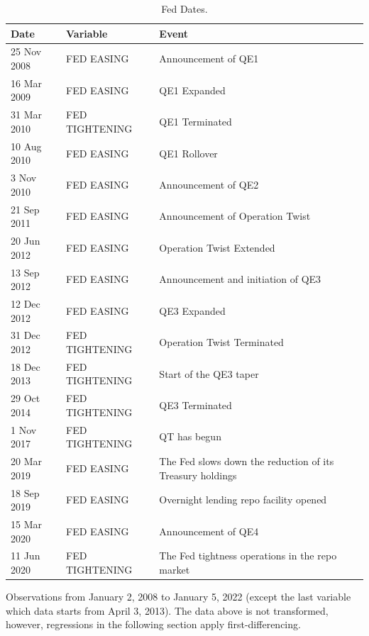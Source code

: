 \documentclass[11pt,a4paper,english,oneside]{article}
\begin{document}
\newpage



\begin{appendices}

\begin{table}[!h] \centering
\begin{threeparttable}
\caption{Fed Dates.}
\label{table:fed}
\begin{tabular}{lll}
\toprule
Date & Variable & Event \\
\midrule
25 Nov 2008 & FED EASING & Announcement of QE1 \\
16 Mar 2009 & FED EASING & QE1 Expanded \\
31 Mar 2010 & FED TIGHTENING & QE1 Terminated \\
10 Aug 2010 & FED EASING & QE1 Rollover \\
3 Nov 2010 & FED EASING & Announcement of QE2 \\
21 Sep 2011 & FED EASING & Announcement of Operation Twist \\
20 Jun 2012 & FED EASING & Operation Twist Extended \\
13 Sep 2012 & FED EASING & Announcement and initiation of QE3 \\
12 Dec 2012 & FED EASING & QE3 Expanded \\
31 Dec 2012 & FED TIGHTENING & Operation Twist Terminated \\
18 Dec 2013 & FED TIGHTENING & Start of the QE3 taper \\
29 Oct 2014 & FED TIGHTENING & QE3 Terminated \\
1 Nov 2017 & FED TIGHTENING & QT has begun \\
20 Mar 2019 & FED EASING & The Fed slows down the reduction of its Treasury holdings \\
18 Sep 2019 & FED EASING & Overnight lending repo facility opened \\
15 Mar 2020 & FED EASING & Announcement of QE4 \\
11 Jun 2020 & FED TIGHTENING & The Fed tightness operations in the repo market \\
\bottomrule
\end{tabular}
Observations from January 2, 2008 to January 5, 2022 (except the last variable which data starts from April 3, 2013). The data above is not transformed, however, regressions in the following section apply first-differencing.
\end{threeparttable}
\end{table}


\end{appendices}
\end{document}
